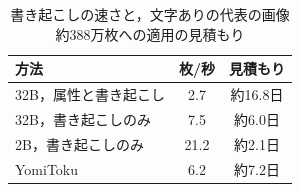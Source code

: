 \begin{table}[t]
    \centering
    \caption{書き起こしの速さと，文字ありの代表の画像約388万枚への適用の見積もり}
    \label{tab_speed}
    \small
    \begin{tabular}{lcc}
        \toprule
        方法 & 枚/秒 & 見積もり \\
        \midrule
        32B，属性と書き起こし & 2.7 & 約16.8日 \\
        32B，書き起こしのみ & 7.5 & 約6.0日 \\
        2B，書き起こしのみ & 21.2 & 約2.1日 \\
        YomiToku & 6.2 & 約7.2日 \\
        \bottomrule
    \end{tabular}
\end{table}
